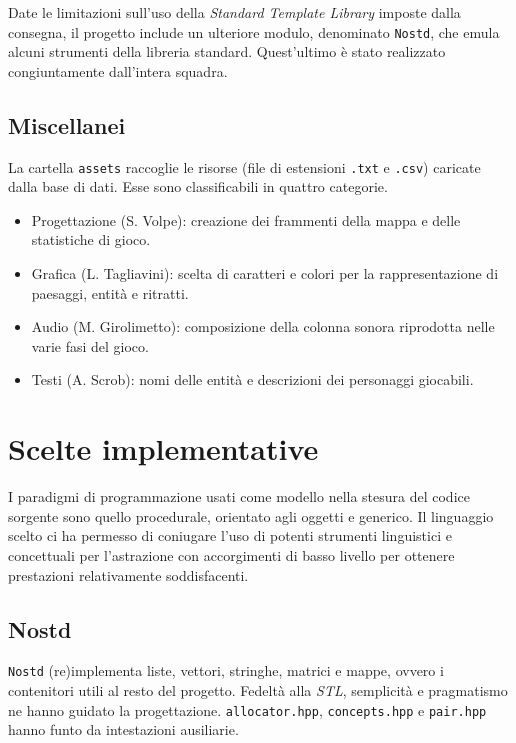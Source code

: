 \documentclass[a4paper]{article}
\begin{document}
Date le limitazioni sull'uso della \emph{Standard Template Library} imposte
dalla consegna, il progetto include un ulteriore modulo, denominato
\verb!Nostd!, che emula alcuni strumenti della libreria standard. Quest'ultimo
\`e stato realizzato congiuntamente dall'intera squadra.

\subsection{Miscellanei}

La cartella \verb!assets! raccoglie le risorse (file di estensioni \verb!.txt! e
\verb!.csv!) caricate dalla base di dati.
Esse sono classificabili in quattro categorie.

\begin{itemize}
  \item Progettazione (S. Volpe): creazione dei frammenti della mappa e delle
    statistiche di gioco.
  \item Grafica (L. Tagliavini): scelta di caratteri e colori per la
    rappresentazione di paesaggi, entit\`a e ritratti.
  \item Audio (M. Girolimetto): composizione della colonna sonora riprodotta
    nelle varie fasi del gioco.
  \item Testi (A. Scrob): nomi delle entit\`a e descrizioni dei personaggi
    giocabili.
\end{itemize}

\section{Scelte implementative}

I paradigmi di programmazione usati come modello nella stesura del codice
sorgente sono quello procedurale, orientato agli oggetti e generico. Il
linguaggio scelto ci ha permesso di coniugare l'uso di potenti strumenti
linguistici e concettuali per l'astrazione con accorgimenti di basso livello
per ottenere prestazioni relativamente soddisfacenti.

\subsection{Nostd}

\verb!Nostd! (re)implementa liste, vettori, stringhe, matrici e mappe, ovvero i
contenitori utili al resto del progetto. Fedelt\`a alla \emph{STL},
semplicit\`a e pragmatismo ne hanno guidato la progettazione.
\verb!allocator.hpp!, \verb!concepts.hpp! e \verb!pair.hpp! hanno funto da
intestazioni ausiliarie.
\end{document}
